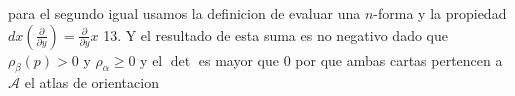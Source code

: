 \begin{bookproof}{}
\[\]
para el segundo igual usamos la definicion de evaluar una $n$-forma y la propiedad $dx(\frac{\partial }{\partial y})=\frac{\partial }{\partial y}x$ 13. Y el resultado de esta suma es no negativo dado que $\rho_{\beta}(p)>0$ y $\rho_{\alpha }\geq 0$ y el $\det$ es mayor que $0$ por que ambas cartas pertencen a $\mathcal A$ el atlas de orientacion

\bookqed
\end{bookproof}

